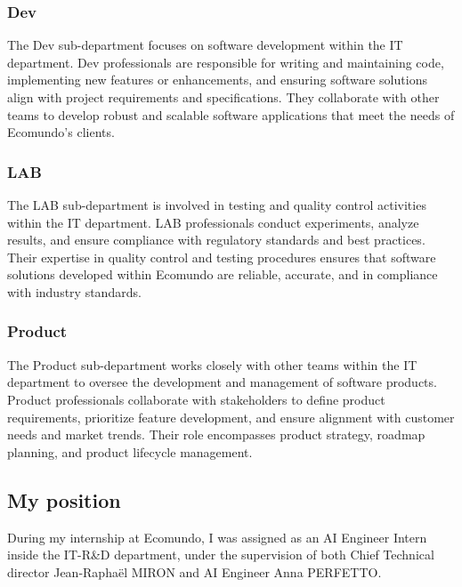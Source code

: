 \documentclass[a4paper,12pt,twoside]{report}
\begin{document}
\subsubsection{Dev}

The Dev sub-department focuses on software development within the IT department. Dev professionals are responsible for writing and maintaining code, implementing new features or enhancements, and ensuring software solutions align with project requirements and specifications. They collaborate with other teams to develop robust and scalable software applications that meet the needs of Ecomundo's clients.

\subsubsection{LAB}

The LAB sub-department is involved in testing and quality control activities within the IT department. LAB professionals conduct experiments, analyze results, and ensure compliance with regulatory standards and best practices. Their expertise in quality control and testing procedures ensures that software solutions developed within Ecomundo are reliable, accurate, and in compliance with industry standards.

\subsubsection{Product}

The Product sub-department works closely with other teams within the IT department to oversee the development and management of software products. Product professionals collaborate with stakeholders to define product requirements, prioritize feature development, and ensure alignment with customer needs and market trends. Their role encompasses product strategy, roadmap planning, and product lifecycle management.

\subsection{My position}
During my internship at Ecomundo, I was assigned as an AI Engineer Intern inside the  IT-R\&D department, under the supervision of both Chief Technical director Jean-Raphaël MIRON and AI Engineer Anna PERFETTO.
\end{document}
